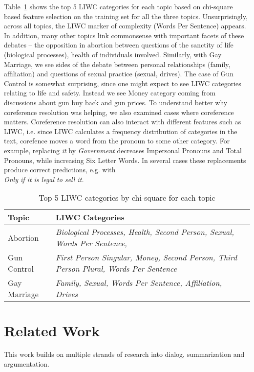 \documentclass[11pt]{article}
\begin{document}
Table~\ref{chi-sq} shows the top 5 LIWC categories for each topic
based on chi-square based feature selection on the training set for
all the three topics. Unsurprisingly, across all topics, the LIWC
marker of complexity (Words Per Sentence) appears. In addition, many
other topics link commonsense with important facets of these debates
-- the opposition in abortion between questions of the sanctity of
life (biological processes), health of individuals involved. Similarly, with Gay Marriage, we see sides
of the debate between personal relationships (family, affiliation) and
questions of sexual practice (sexual, drives). The case of Gun Control
is somewhat surprising, since one might expect to see LIWC categories
relating to life and safety. Instead we see Money category coming from discussions about gun buy back and gun prices.
To understand better why coreference resolution was helping, we also
examined cases where coreference matters. Coreference resolution can
also interact with different features such as LIWC, i.e.  since LIWC
calculates a frequency distribution of categories in the text,
corefence moves a word from the pronoun to some other category.  For
example, replacing {\it it} by {\it Government} decreases Impersonal
Pronouns and Total Pronouns, while increasing Six Letter Words. In
several cases these replacements produce correct predictions, e.g.
with \\ {\it Only if it is legal to sell it. }

\begin{table}[th!]
\begin{small}
\begin{tabular}{|p{2.0cm}|p{4.5cm}|} \hline
Topic& LIWC Categories \\  \hline
Abortion & {\it \small  Biological Processes, Health, Second Person, Sexual, Words Per Sentence, }\\  \hline
Gun Control & {\it \small First Person Singular, Money, Second Person, Third Person Plural, Words Per Sentence }\\  \hline
Gay Marriage& {\it \small  Family, Sexual, Words Per Sentence, Affiliation, Drives }\\  \hline
\end{tabular}
\end{small}
\caption{\label{chi-sq} Top 5 LIWC categories by chi-square for each topic}
\end{table}

\section{Related Work}
\label{rel-sec}
This work builds on multiple strands of research into dialog,
summarization and argumentation.
\end{document}
